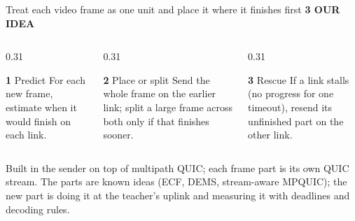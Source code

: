 \documentclass[aspectratio=169,11pt]{beamer}
\newcommand{\eyebrow}[1]{{\color{accent}\footnotesize\bfseries\MakeUppercase{#1}}\par\smallskip}
\newcommand{\bignum}[2]{{\color{#1}\Huge\bfseries #2}}
\begin{document}
\begin{frame}{Treat each video frame as one unit and place it where it finishes first}
  \eyebrow{3 \textperiodcentered{} Our idea}
  \begin{columns}[T]
    \begin{column}{0.31\textwidth}
      \begin{block}{\bignum{blue}{1}\;\; Predict}
        For each new frame, estimate when it would finish on each link.
      \end{block}
    \end{column}
    \begin{column}{0.31\textwidth}
      \begin{block}{\bignum{blue}{2}\;\; Place or split}
        Send the whole frame on the earlier link; split a large frame across both only if that finishes sooner.
      \end{block}
    \end{column}
    \begin{column}{0.31\textwidth}
      \begin{block}{\bignum{blue}{3}\;\; Rescue}
        If a link stalls (no progress for one timeout), resend its unfinished part on the other link.
      \end{block}
    \end{column}
  \end{columns}
  \vfill
  Built in the sender on top of multipath QUIC; each frame part is its own QUIC stream. The parts are known ideas (ECF, DEMS, stream-aware MPQUIC); the new part is doing it at the teacher's uplink and measuring it with deadlines and decoding rules.
\end{frame}
\end{document}
